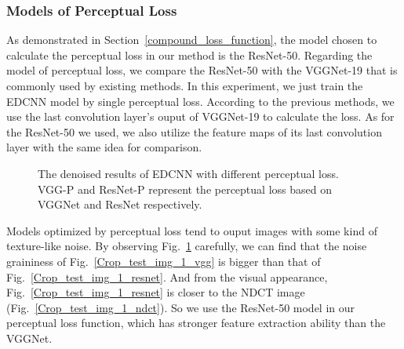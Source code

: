\documentclass[conference]{IEEEtran}
\begin{document}
            \medskip
            
            \subsubsection{Models of Perceptual Loss}
                As demonstrated in Section~\ref{compound_loss_function}, the model chosen to calculate the perceptual loss in our method is the ResNet-50.
                Regarding the model of perceptual loss, we compare the ResNet-50 with the VGGNet-19 that is commonly used by existing methods.
                In this experiment, we just train the EDCNN model by single perceptual loss.
                According to the previous methods, we use the last convolution layer's ouput of VGGNet-19 to calculate the loss.
                As for the ResNet-50 we used, we also utilize the feature maps of its last convolution layer with the same idea for comparison.
                
                \begin{figure}[h]
                    \caption{The denoised results of EDCNN with different perceptual loss. VGG-P and ResNet-P represent the perceptual loss based on VGGNet and ResNet respectively.}
                    \label{perceptual_model_comparison}
                \end{figure}

                Models optimized by perceptual loss tend to ouput images with some kind of texture-like noise.
                By observing Fig.~\ref{perceptual_model_comparison} carefully, we can find that the noise graininess of Fig.~\ref{Crop_test_img_1_vgg} is bigger than that of Fig.~\ref{Crop_test_img_1_resnet}. 
                And from the visual appearance, Fig.~\ref{Crop_test_img_1_resnet} is closer to the NDCT image (Fig.~\ref{Crop_test_img_1_ndct}).
                So we use the ResNet-50 model in our perceptual loss function, which has stronger feature extraction ability than the VGGNet.
\end{document}
